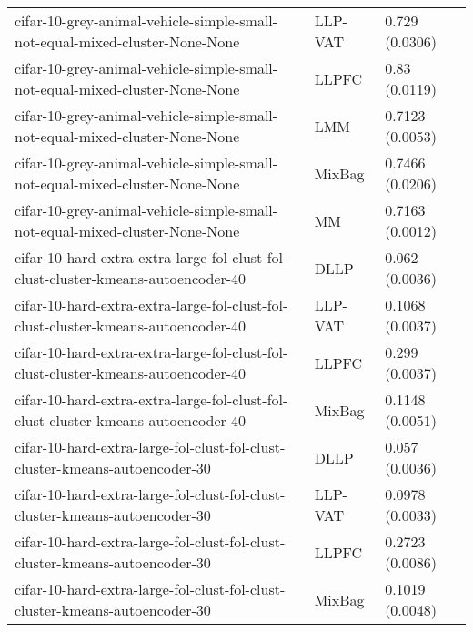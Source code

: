 \begin{longtable}{lll}
                                  cifar-10-grey-animal-vehicle-simple-small-not-equal-mixed-cluster-None-None &   LLP-VAT &                            0.729 (0.0306) \\
                                  cifar-10-grey-animal-vehicle-simple-small-not-equal-mixed-cluster-None-None &     LLPFC &                             0.83 (0.0119) \\
                                  cifar-10-grey-animal-vehicle-simple-small-not-equal-mixed-cluster-None-None &       LMM &                           0.7123 (0.0053) \\
                                  cifar-10-grey-animal-vehicle-simple-small-not-equal-mixed-cluster-None-None &    MixBag &                           0.7466 (0.0206) \\
                                  cifar-10-grey-animal-vehicle-simple-small-not-equal-mixed-cluster-None-None &        MM &                           0.7163 (0.0012) \\
                            cifar-10-hard-extra-extra-large-fol-clust-fol-clust-cluster-kmeans-autoencoder-40 &      DLLP &                            0.062 (0.0036) \\
                            cifar-10-hard-extra-extra-large-fol-clust-fol-clust-cluster-kmeans-autoencoder-40 &   LLP-VAT &                           0.1068 (0.0037) \\
                            cifar-10-hard-extra-extra-large-fol-clust-fol-clust-cluster-kmeans-autoencoder-40 &     LLPFC &                            0.299 (0.0037) \\
                            cifar-10-hard-extra-extra-large-fol-clust-fol-clust-cluster-kmeans-autoencoder-40 &    MixBag &                           0.1148 (0.0051) \\
                                  cifar-10-hard-extra-large-fol-clust-fol-clust-cluster-kmeans-autoencoder-30 &      DLLP &                            0.057 (0.0036) \\
                                  cifar-10-hard-extra-large-fol-clust-fol-clust-cluster-kmeans-autoencoder-30 &   LLP-VAT &                           0.0978 (0.0033) \\
                                  cifar-10-hard-extra-large-fol-clust-fol-clust-cluster-kmeans-autoencoder-30 &     LLPFC &                           0.2723 (0.0086) \\
                                  cifar-10-hard-extra-large-fol-clust-fol-clust-cluster-kmeans-autoencoder-30 &    MixBag &                           0.1019 (0.0048) \\

\end{longtable}
